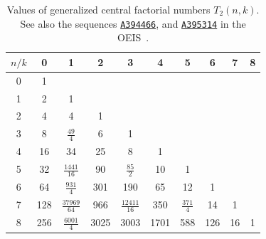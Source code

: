 \begin{table}[H]
  \begin{center}
    \setlength\extrarowheight{-6pt}
    \begin{tabular}{c|ccccccccc}
      $n/k$ & 0 & 1 & 2 & 3 & 4 & 5 & 6 & 7 & 8 \\ [3px]
      \hline
      0 & 1 &   &   &   &   &   &   &   &   \\
      1 & 2 & 1 &   &   &   &   &   &   &   \\
      2 & 4 & 4 & 1 &   &   &   &   &   &   \\
      3 & 8 & $\tfrac{49}{4}$ & 6 & 1 &   &   &   &   &   \\
      4 & 16 & 34 & 25 & 8 & 1 &   &   &   &   \\
      5 & 32 & $\tfrac{1441}{16}$ & 90 & $\tfrac{85}{2}$ & 10 & 1 &   &   &   \\
      6 & 64 & $\tfrac{931}{4}$ & 301 & 190 & 65 & 12 & 1 &   &   \\
      7 & 128 & $\tfrac{37969}{64}$ & 966 & $\tfrac{12411}{16}$ & 350 & $\tfrac{371}{4}$ & 14 & 1 &   \\
      8 & 256 & $\tfrac{6001}{4}$ & 3025 & 3003 & 1701 & 588 & 126 & 16 & 1 \\
    \end{tabular}
  \end{center}
  \caption{Values of generalized central factorial numbers $T_2(n,k)$.
    See also the sequences \href{https://oeis.org/A394466}{\texttt{A394466}},
    and \href{https://oeis.org/A395314}{\texttt{A395314}} in the OEIS~\cite{sloane2003line}.
  }
  \label{tab:central-factorial-numbers-t2}
\end{table}
